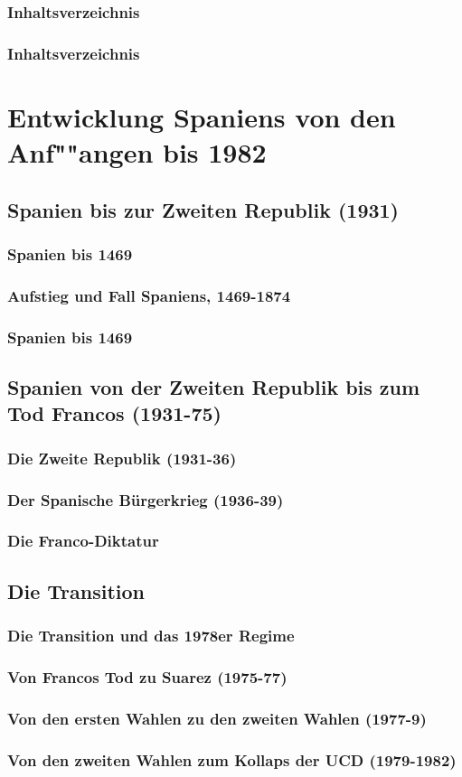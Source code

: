 \documentclass[12pt]{beamer}
\begin{document}
\begin{frame}[plain]
\frametitle{Inhaltsverzeichnis}
\tableofcontents
\end{frame}

\begin{frame}
\frametitle{Inhaltsverzeichnis}
\tableofcontents[subsubsectionstyle=hide]
\end{frame}

\section{Entwicklung Spaniens von den Anf""angen bis 1982}
\subsection{Spanien bis zur Zweiten Republik (1931)}
\subsubsection{Spanien bis 1469}
\subsubsection{Aufstieg und Fall Spaniens, 1469-1874}
\subsubsection{Spanien bis 1469}
\subsection{Spanien von der Zweiten Republik bis zum Tod Francos (1931-75)}
\subsubsection{Die Zweite Republik (1931-36)}
\subsubsection{Der Spanische Bürgerkrieg (1936-39)}
\subsubsection{Die Franco-Diktatur}
\subsection{Die Transition}
\subsubsection{Die Transition und das 1978er Regime}
\subsubsection{Von Francos Tod zu Suarez (1975-77)}
\subsubsection{Von den ersten Wahlen zu den zweiten Wahlen (1977-9)}
\subsubsection{Von den zweiten Wahlen zum Kollaps der UCD (1979-1982)} 
\begin{frame}

\end{frame}
\end{document}
